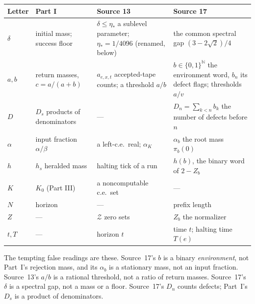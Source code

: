 \documentclass[11pt,letterpaper]{article}
\numberwithin{equation}{section}
\theoremstyle{definition}
\theoremstyle{remark}
\newcommand{\N}{\mathbb N}
\newcommand{\cZ}{\mathcal Z}
\newcommand{\etastar}{\eta_*}
\begin{document}
\begin{center}
\small
\begin{tabularx}{\textwidth}{@{}lYYY@{}}
\toprule
Letter & Part I & Source 13 & Source 17\\
\midrule
$\delta$ & initial mass; success floor & $\delta\le\etastar$ a sublevel parameter; $\etastar=1/4096$ (renamed, below) & the common spectral gap $(3-2\sqrt2)/4$\\
$a,b$ & return masses, $c=a/(a+b)$ & $a_{e,x,t}$ accepted-tape counts; a threshold $a/b$ & $b\in\{0,1\}^{\N}$ the environment word, $b_n$ its defect flags; thresholds $a/v$\\
$D$ & $D_s$ products of denominators & --- & $D_n=\sum_{k<n}b_k$ the number of defects before $n$\\
$\alpha$ & input fraction $\alpha/\beta$ & a left-c.e.\ real; $\alpha_K$ & $\alpha_b$ the root mass $\pi_b(0)$\\
$h$ & $h_s$ heralded mass & halting tick of a run & $h(b)$, the binary word of $2-Z_b$\\
$K$ & $K_0$ (Part III) & a noncomputable c.e.\ set & ---\\
$N$ & horizon & --- & prefix length\\
$Z$ & --- & $\cZ$ zero sets & $Z_b$ the normalizer\\
$t,T$ & --- & horizon $t$ & time $t$; halting time $T(e)$\\
\bottomrule
\end{tabularx}
\end{center}

The tempting false readings are these. Source~17's $b$ is a binary
\emph{environment}, not Part~I's rejection mass, and its $\alpha_b$ is a
stationary mass, not an input fraction. Source~13's $a/b$ is a rational
threshold, not a ratio of return masses. Source~17's $\delta$ is a spectral
gap, not a mass or a floor. Source~17's $D_n$ counts defects; Part~I's $D_s$ is
a product of denominators.
\end{document}

